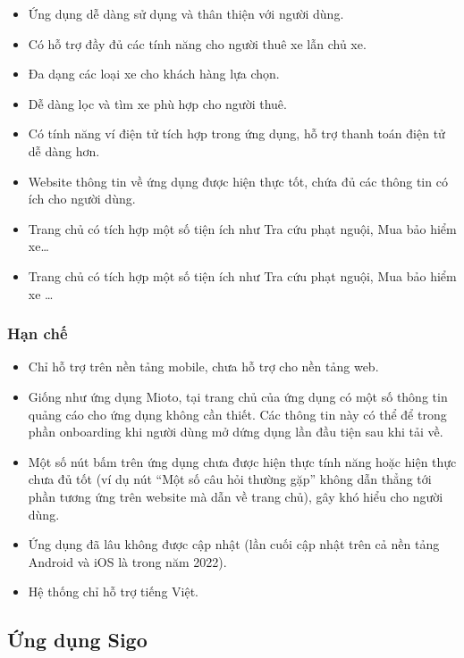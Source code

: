 \documentclass[../main.tex]{subfiles}
\begin{document}
	\begin{itemize}
		\item Ứng dụng dễ dàng sử dụng và thân thiện với người dùng.
		\item Có hỗ trợ đầy đủ các tính năng cho người thuê xe lẫn chủ xe.
		\item Đa dạng các loại xe cho khách hàng lựa chọn.
		\item Dễ dàng lọc và tìm xe phù hợp cho người thuê.
		\item Có tính năng ví điện tử tích hợp trong ứng dụng, hỗ trợ thanh toán điện tử dễ dàng hơn.
		\item Website thông tin về ứng dụng được hiện thực tốt, chứa đủ các thông tin có ích cho người dùng.
		\item Trang chủ có tích hợp một số tiện ích như Tra cứu phạt nguội, Mua bảo hiểm xe\ldots
		\item Trang chủ có tích hợp một số tiện ích như Tra cứu phạt nguội, Mua bảo hiểm xe \ldots
	\end{itemize}

	\subsubsection{Hạn chế}

	\begin{itemize}
		\item Chỉ hỗ trợ trên nền tảng mobile, chưa hỗ trợ cho nền tảng web.
		\item Giống như ứng dụng Mioto, tại trang chủ của ứng dụng có một số thông tin quảng cáo cho ứng dụng không
		cần thiết. Các thông tin này có thể để trong phần onboarding khi người dùng mở dứng dụng lần đầu tiện sau khi
		tải về.
		\item Một số nút bấm trên ứng dụng chưa được hiện thực tính năng hoặc hiện thực chưa đủ tốt (ví dụ nút ``Một
		số câu hỏi thường gặp'' không dẫn thẳng tới phần tương ứng trên website mà dẫn về trang chủ), gây khó hiểu cho
		người dùng.
		\item Ứng dụng đã lâu không được cập nhật (lần cuối cập nhật trên cả nền tảng Android và iOS là trong năm
		2022).
		\item Hệ thống chỉ hỗ trợ tiếng Việt.
	\end{itemize}

	\subsection{Ứng dụng Sigo}
\end{document}
